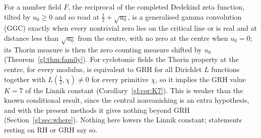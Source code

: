 \label{chap:gl}

For a number field $F$, the reciprocal of the completed Dedekind zeta function, tilted by $u_0\ge0$ and so read at $\tfrac12+\sqrt{u_0}$, is a generalised gamma convolution (GGC) exactly when every nontrivial zero lies on the critical line or is real and at distance less than $\sqrt{u_0}$ from the centre, with no zero at the centre when $u_0=0$; its Thorin measure is then the zero counting measure shifted by $u_0$ (Theorem~\ref{gl:thm:family}). For cyclotomic fields the Thorin property at the centre, for every modulus, is equivalent to GRH for all Dirichlet $L$ functions together with $L(\tfrac12,\chi)\ne0$ for every primitive $\chi$, so it implies the GRH value $K=7$ of the Linnik constant (Corollary~\ref{gl:cor:K7}). This is weaker than the known conditional result, since the central nonvanishing is an extra hypothesis, and with the present methods it gives nothing beyond GRH (Section~\ref{gl:sec:where}). Nothing here lowers the Linnik constant; statements resting on RH or GRH say so.
